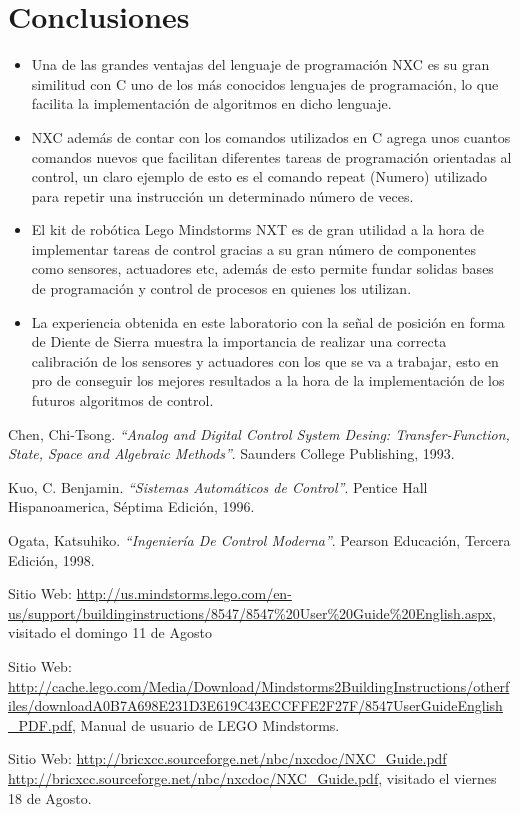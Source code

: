 \documentclass[twocolumn]{IEEEtran}
\begin{document}
\section{Conclusiones}
\begin{itemize}
 \item Una de las grandes ventajas del lenguaje de programación NXC es su gran similitud con C uno de los más conocidos lenguajes de programación, lo que facilita la implementación de algoritmos en dicho lenguaje.
 \item NXC además de contar con los comandos utilizados en C agrega unos cuantos comandos nuevos que facilitan diferentes tareas de programación orientadas al control, un claro ejemplo de esto es el comando repeat (Numero) utilizado para repetir una instrucción un determinado número de veces.
 \item El kit de robótica Lego Mindstorms NXT  es de gran utilidad a la hora de implementar tareas de control gracias a su gran número de componentes como sensores, actuadores etc, además de esto permite fundar solidas bases de programación y control de procesos  en quienes los utilizan.
 \item La experiencia obtenida en este laboratorio con la señal de posición en forma de Diente de Sierra muestra la importancia de realizar una correcta calibración de los sensores y actuadores con los que se va a trabajar, esto en pro de conseguir los mejores resultados a la hora de la implementación de los futuros algoritmos de control.
\end{itemize}


\begin{thebibliography}{99}

 Chen, Chi-Tsong.
{\em "`Analog and Digital Control System Desing: Transfer-Function, State, Space and Algebraic Methods"'}.
Saunders College Publishing, 1993.

 Kuo, C. Benjamin.
{\em "`Sistemas Automáticos de Control"'}.
Pentice Hall Hispanoamerica, Séptima Edición, 1996.

 Ogata, Katsuhiko.
{\em "`Ingeniería De Control Moderna"'}.
Pearson Educación, Tercera Edición, 1998.

 Sitio Web: \url{http://us.mindstorms.lego.com/en-us/support/buildinginstructions/8547/8547%20User%20Guide%20English.aspx}, visitado el domingo 11 de Agosto

 Sitio Web: \url{http://cache.lego.com/Media/Download/Mindstorms2BuildingInstructions/otherfiles/downloadA0B7A698E231D3E619C43ECCFFE2F27F/8547UserGuideEnglish_PDF.pdf}, Manual de usuario de LEGO Mindstorms.

 Sitio Web: \url{http://bricxcc.sourceforge.net/nbc/nxcdoc/NXC_Guide.pdf
http://bricxcc.sourceforge.net/nbc/nxcdoc/NXC_Guide.pdf}, visitado el viernes 18 de Agosto.
\end{thebibliography}
\end{document}
